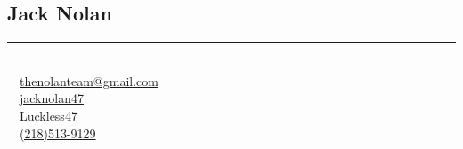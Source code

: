 \documentclass[letterpaper, 11pt]{article}
\begin{document}
    \begin{raggedright}
    \section*{\bfseries{Jack Nolan}}
    {\color{ForestGreen}\rule{40mm}{0.5mm}}
        \begin{raggedright} \small
            \vspace{6pt} \\
            \faMailBulk\ \hspace{3pt}\ \href{www.mailto:thenolanteam@gmail.com}{thenolanteam@gmail.com} \\
            \faLinkedin\ \hspace{3pt}\ \href{https://www.linkedin.com/in/jacknolan47}  {jacknolan47} \\
            \faGithub\ \hspace{3pt}\ \href{https://www.github.com/Luckless47}{Luckless47} \\
            \faPhone\ \hspace{3pt}\ \href{tel:+12185139129}{(218)513-9129} \\
        \end{raggedright}
    \end{raggedright}
    \vspace{12pt}
\end{document}
